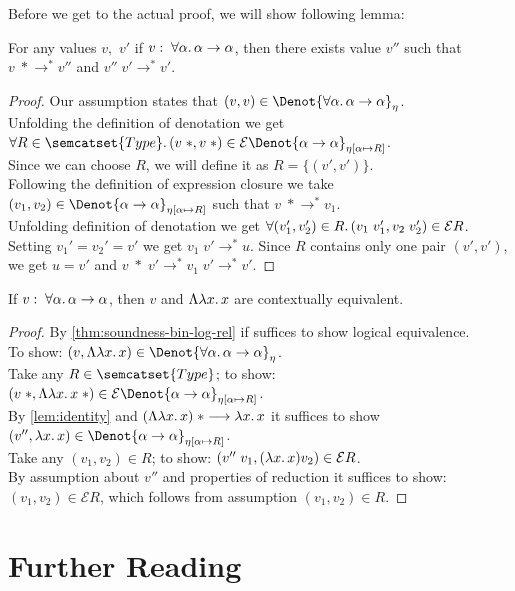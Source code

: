 Before we get to the actual proof, we will show following lemma:
\begin{lemma}\label{lem:identity}
  For any values $v,$ $v'$ if $v:\; \forall\alpha\ldotp \alpha \to \alpha$,
  then there exists value $v''$ such that $v\;* \longrightarrow^* v''$ and
  $v'' \; v' \longrightarrow^* v'$.
\end{lemma}
\begin{proof}
  Our assumption states that
    $(v, v) \in \Denot{\forall\alpha\ldotp\alpha\to\alpha}_\eta$.\\
  Unfolding the definition of denotation we get\\
  $\forall R\in\semcatset{Type}\ldotp (v\;*, v\;*) \in
    \mathcal E \Denot{\alpha \to \alpha}_{\eta[\alpha\mapsto R]}$.\\
  Since we can choose $R$, we will define it as $R = \{(v', v')\}$.\\
  Following the definition of expression closure we take\\
  $(v_1, v_2) \in \Denot{\alpha \to \alpha}_{\eta[\alpha \mapsto R]}$
    such that $v\;* \longrightarrow^* v_1$.\\
  Unfolding definition of denotation we get
    $\forall(v_1', v_2')\in R\ldotp (v_1\; v_1', v_2\; v_2')\in\mathcal E R$.\\
  Setting $v_1' = v_2' = v'$ we get $v_1 \;v' \longrightarrow^* u$.
    Since $R$ contains only one pair $(v',v')$,\\
  we get $u=v'$ and
    $v\;*\; v'\longrightarrow^* v_1\; v' \longrightarrow^* v'$.
\end{proof}

\begin{theorem}
  If $v:\; \forall\alpha\ldotp\alpha\to\alpha$, then
  $v$ and $\Lambda\lambda x\ldotp x$ are contextually equivalent.
\end{theorem}
\begin{proof}
  By \autoref{thm:soundness-bin-log-rel}
    if suffices to show logical equivalence.\\
  To show: $(v, \Lambda\lambda x\ldotp x) \in
    \Denot{\forall\alpha\ldotp\alpha\to\alpha}_\eta$.\\
  Take any $R \in \semcatset{Type}$;
    to show: $(v\; *, \Lambda\lambda x\ldotp x\;*) \in
      \mathcal E\Denot{\alpha\to\alpha}_{\eta[\alpha\mapsto R]}$.\\
  By \autoref{lem:identity} and
    $(\Lambda\lambda x\ldotp x)\;* \longrightarrow \lambda x\ldotp x$
      it suffices to show \\
  $(v'', \lambda x\ldotp x )\in
    \Denot{\alpha\to\alpha}_{\eta[\alpha \mapsto R]}$.\\
  Take any $(v_1, v_2) \in R$;
    to show: $(v''\; v_1, (\lambda x\ldotp x) v_2) \in \mathcal E R$.\\
  By assumption about $v''$ and properties of reduction it suffices to show:\\
  $(v_1, v_2) \in \mathcal E R$,
    which follows from assumption $(v_1, v_2) \in R$.
\end{proof}

\section{Further Reading}
